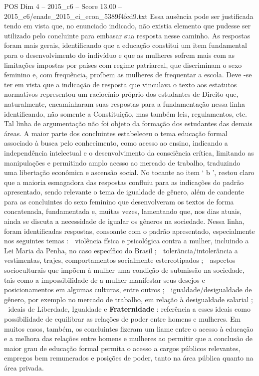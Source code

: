 \begin{textsample}{POS Dim 4 – 2015\_c6 – Score 13.00 – 2015\_c6/enade\_2015\_ci\_econ\_5389f4fcd9.txt}
Essa ausência pode ser justificada tendo em vista que, no enunciado indicado, não existia elemento que pudesse ser utilizado pelo concluinte para embasar sua resposta nesse caminho.
As respostas foram mais gerais, identificando que a educação constitui um item fundamental para o desenvolvimento do indivíduo e que as mulheres sofrem mais com as limitações impostas por países com regime patriarcal, que discriminam o sexo feminino e, com frequência, proíbem as mulheres de frequentar a escola.
Deve -se ter em vista que a indicação de resposta que vinculava o texto aos estatutos normativos representou um raciocínio próprio dos estudantes de Direito que, naturalmente, encaminharam suas respostas para a fundamentação nessa linha identificando, não somente a Constituição, mas também leis, regulamentos, etc.
Tal linha de argumentação não foi objeto da formação dos estudantes das demais áreas.
A maior parte dos concluintes estabeleceu o tema educação formal associado à busca pelo conhecimento, como acesso ao ensino, indicando a independência intelectual e o desenvolvimento da consciência crítica, limitando as manipulações e permitindo amplo acesso ao mercado de trabalho, traduzindo uma libertação econômica e ascensão social.
No tocante ao item ‘ b ’, restou claro que a maioria esmagadora das respostas confluiu para as indicações do padrão apresentado, sendo relevante o tema de igualdade de gênero, além de candente para as concluintes do sexo feminino que desenvolveram os textos de forma concatenada, fundamentada e, muitas vezes, lamentando que, nos dias atuais, ainda se discuta a necessidade de igualar os gêneros na sociedade.
Nessa linha, foram identificadas respostas, consoante com o padrão apresentado, especialmente nos seguintes temas :  violência física e psicológica contra a mulher, incluindo a Lei Maria da Penha, no caso específico do Brasil ;  tolerância/intolerância a vestimentas, trajes, comportamentos socialmente estereotipados ;  aspectos socioculturais que impõem à mulher uma condição de submissão na sociedade, tais como a impossibilidade de a mulher manifestar seus desejos e posicionamentos em algumas culturas, entre outros ;  igualdade/desigualdade de gênero, por exemplo no mercado de trabalho, em relação à desigualdade salarial ;  ideais de Liberdade, Igualdade e \textbf{Fraternidade} : referência a esses ideais como possibilidade de equilibrar as relações de poder entre homens e mulheres.
Em muitos casos, também, os concluintes fizeram um liame entre o acesso à educação e a melhora das relações entre homens e mulheres ao permitir que a conclusão de maior grau de educação formal permita o acesso a cargos públicos relevantes, empregos bem remunerados e posições de poder, tanto na área pública quanto na área privada.

\end{textsample}

